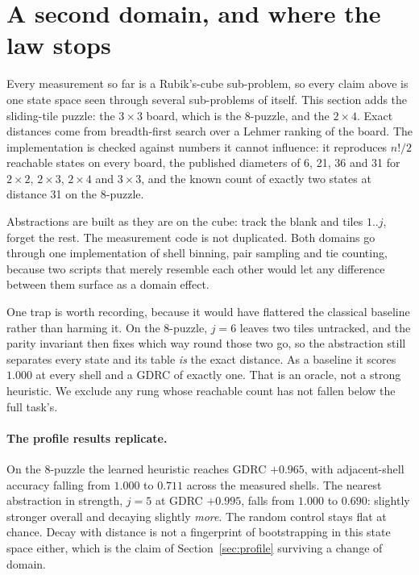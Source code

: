 \section{A second domain, and where the law stops}
\label{sec:domain}

Every measurement so far is a Rubik's-cube sub-problem, so every claim above is
one state space seen through several sub-problems of itself. This section adds
the sliding-tile puzzle: the $3\times3$ board, which is the 8-puzzle, and the
$2\times4$. Exact distances come from breadth-first search over a Lehmer ranking
of the board. The implementation is checked against numbers it cannot influence:
it reproduces $n!/2$ reachable states on every board, the published diameters of
6, 21, 36 and 31 for $2\times2$, $2\times3$, $2\times4$ and $3\times3$, and the
known count of exactly two states at distance 31 on the 8-puzzle.

Abstractions are built as they are on the cube: track the blank and tiles
$1..j$, forget the rest. The measurement code is not duplicated. Both domains go
through one implementation of shell binning, pair sampling and tie counting,
because two scripts that merely resemble each other would let any difference
between them surface as a domain effect.

One trap is worth recording, because it would have flattered the classical
baseline rather than harming it. On the 8-puzzle, $j = 6$ leaves two tiles
untracked, and the parity invariant then fixes which way round those two go, so
the abstraction still separates every state and its table \emph{is} the exact
distance. As a baseline it scores $1.000$ at every shell and a GDRC of exactly
one. That is an oracle, not a strong heuristic. We exclude any rung whose
reachable count has not fallen below the full task's.

\paragraph{The profile results replicate.} On the 8-puzzle the learned heuristic
reaches GDRC $+0.965$, with adjacent-shell accuracy falling from $1.000$ to
$0.711$ across the measured shells. The nearest abstraction in strength, $j = 5$
at GDRC $+0.995$, falls from $1.000$ to $0.690$: slightly stronger overall and
decaying slightly \emph{more}. The random control stays flat at chance. Decay
with distance is not a fingerprint of bootstrapping in this state space either,
which is the claim of Section~\ref{sec:profile} surviving a change of domain.

